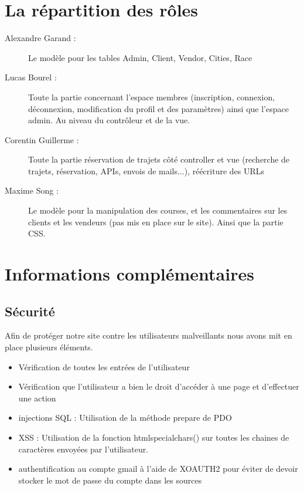 \documentclass{article}
\begin{document}
\section{La répartition des rôles}
\begin{description}
 \item[Alexandre Garand :] Le modèle pour les tables Admin, Client, Vendor, Cities, Race 
 \\
 
 
 \item[Lucas Bourel :] Toute la partie concernant l'espace membres (inscription, connexion, déconnexion, modification du profil et des paramètres) ainsi que l'espace admin. Au niveau du contrôleur et de la vue. 
 \\
 
 \item[Corentin Guillerme :] Toute la partie réservation de trajets côté controller et vue (recherche de trajets, réservation, APIs, envois de mails...), réécriture des URLs
 \\
 
 \item[Maxime Song :] Le modèle pour la manipulation des courses, et les commentaires sur les clients et les vendeurs (pas mis en place sur le site). Ainsi que la partie CSS. 
 \\
\end{description}

\section{Informations complémentaires}
    \subsection{Sécurité}
        Afin de protéger notre site contre les utilisateurs malveillants nous avons mit en place plusieurs éléments.
        \\
        
        \begin{itemize}
        \item Vérification de toutes les entrées de l'utilisateur
        \\
        
        \item Vérification que l'utilisateur a bien le droit d'accéder à une page et d'effectuer une action
        \\
        
        \item injections SQL : Utilisation de la méthode prepare de PDO 
        \\
        
        \item XSS : Utilisation de la fonction htmlspecialchars() sur toutes les chaines de caractères envoyées par l'utilisateur.
        \\
        
        \item authentification au compte gmail à l'aide de XOAUTH2 pour éviter de devoir stocker le mot de passe du compte dans les sources
        
        \end{itemize}
\end{document}
